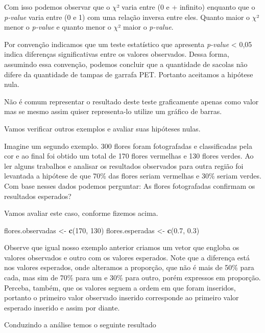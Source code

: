 \documentclass[14pt,titlepage, oneside, openany, a4paper]{book}
\newenvironment{Shaded}{\begin{snugshade}}{\end{snugshade}}
\newcommand{\DecValTok}[1]{\textcolor[rgb]{0.00,0.00,0.81}{#1}}
\newcommand{\FloatTok}[1]{\textcolor[rgb]{0.00,0.00,0.81}{#1}}
\newcommand{\KeywordTok}[1]{\textcolor[rgb]{0.13,0.29,0.53}{\textbf{#1}}}
\newcommand{\NormalTok}[1]{#1}
\newcommand{\StringTok}[1]{\textcolor[rgb]{0.31,0.60,0.02}{#1}}
\begin{document}
Com isso podemos observar que o \(\chi\)² varia entre (0 e + infinito) enquanto que o \emph{p-value} varia entre (0 e 1) com uma relação inversa entre eles. Quanto maior o \(\chi\)² menor o \emph{p-value} e quanto menor o \(\chi\)² maior o \emph{p-value}.

Por convenção indicamos que um teste estatístico que apresenta \emph{p-value} \textless{} 0,05 indica diferenças significativas entre os valores observados. Dessa forma, assumindo essa convenção, podemos concluir que a quantidade de sacolas não difere da quantidade de tampas de garrafa PET. Portanto aceitamos a hipótese nula.

Não é comum representar o resultado deste teste graficamente apenas como valor mas se mesmo assim quiser representa-lo utilize um gráfico de barras.

Vamos verificar outros exemplos e avaliar suas hipóteses nulas.

Imagine um segundo exemplo. 300 flores foram fotografadas e classificadas pela cor e ao final foi obtido um total de 170 flores vermelhas e 130 flores verdes. Ao ler alguns trabalhos e analisar os resultados observados para outra região foi levantada a hipótese de que 70\% das flores seriam vermelhas e 30\% seriam verdes. Com base nesses dados podemos perguntar: As flores fotografadas confirmam os resultados esperados?

Vamos avaliar este caso, conforme fizemos acima.

\begin{Shaded}
\begin{Highlighting}[]
\NormalTok{flores.observadas <-}\StringTok{ }\KeywordTok{c}\NormalTok{(}\DecValTok{170}\NormalTok{, }\DecValTok{130}\NormalTok{)}
\NormalTok{flores.esperadas <-}\StringTok{ }\KeywordTok{c}\NormalTok{(}\FloatTok{0.7}\NormalTok{, }\FloatTok{0.3}\NormalTok{)}
\end{Highlighting}
\end{Shaded}

Observe que igual nosso exemplo anterior criamos um vetor que engloba os valores observados e outro com os valores esperados. Note que a diferença está nos valores esperados, onde alteramos a proporção, que não é mais de 50\% para cada, mas sim de 70\% para um e 30\% para outro, porém expressos em proporção. Perceba, também, que os valores seguem a ordem em que foram inseridos, portanto o primeiro valor observado inserido corresponde ao primeiro valor esperado inserido e assim por diante.

Conduzindo a análise temos o seguinte resultado
\end{document}
